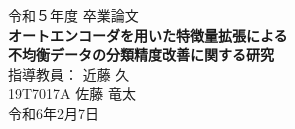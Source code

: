 \thispagestyle{empty}
\begin{center}
  \vspace*{20mm}
  {\LARGE 令和５年度 卒業論文\\}
  \vfill
  \textbf{{\huge   オートエンコーダを用いた特徴量拡張による\\不均衡データの分類精度改善に関する研究\\}}
  \vfill
  {\LARGE 指導教員： 近藤 久\\}
  \vfill
  {\LARGE 19T7017A   佐藤 竜太\\}
  \vfill
  {\LARGE 令和6年2月7日\\}
  \vspace*{20mm}
\end{center}
\newpage
